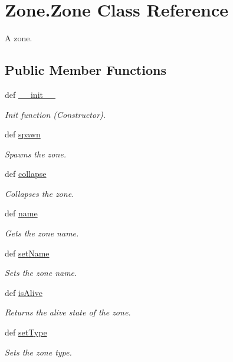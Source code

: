 \hypertarget{class_zone_1_1_zone}{
\section{Zone.Zone Class Reference}
\label{class_zone_1_1_zone}
}


A zone.  


\subsection*{Public Member Functions}
\begin{DoxyCompactItemize}
\item 
def \hyperlink{class_zone_1_1_zone_afe0e971765baa04ca770cbdc685efbb6}{\_\-\_\-init\_\-\_\-}
\begin{DoxyCompactList}\small\item\em Init function (Constructor). \item\end{DoxyCompactList}\item 
def \hyperlink{class_zone_1_1_zone_a6197bd3a82e33df84c7a24a2bd698516}{spawn}
\begin{DoxyCompactList}\small\item\em Spawns the zone. \item\end{DoxyCompactList}\item 
def \hyperlink{class_zone_1_1_zone_a82cd5417c0fd6dc0cb7d1b8a3399e174}{collapse}
\begin{DoxyCompactList}\small\item\em Collapses the zone. \item\end{DoxyCompactList}\item 
def \hyperlink{class_zone_1_1_zone_acbb02f4e05a741d0f0817f3f7a72b215}{name}
\begin{DoxyCompactList}\small\item\em Gets the zone name. \item\end{DoxyCompactList}\item 
def \hyperlink{class_zone_1_1_zone_a01a15c4548a4e2675890cec3b6172beb}{setName}
\begin{DoxyCompactList}\small\item\em Sets the zone name. \item\end{DoxyCompactList}\item 
def \hyperlink{class_zone_1_1_zone_af99fbbc555e6f93d62126c17ae9a8052}{isAlive}
\begin{DoxyCompactList}\small\item\em Returns the alive state of the zone. \item\end{DoxyCompactList}\item 
def \hyperlink{class_zone_1_1_zone_ae86cd40bd98448e74ed206e515a1f5da}{setType}
\begin{DoxyCompactList}\small\item\em Sets the zone type. \item\end{DoxyCompactList}\end{DoxyCompactItemize}
